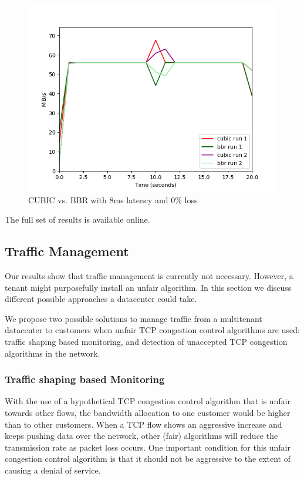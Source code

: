 \documentclass{article}
\begin{document}
\begin{figure}[H]
	\centering
		\includegraphics[scale=0.4]{figs/cubic_vs_bbr_8_0.png}
		\caption{CUBIC vs. BBR with 8ms latency and 0\% loss}
	\label{fig:bbr-cubic-0}
\end{figure}

The full set of results is available online\cite{git-lsproj}.


\subsection{Traffic Management}

Our results show that traffic management is currently not necessary. However, a
tenant might purposefully install an unfair algorithm. In this section we
discuss different possible approaches a datacenter could take.

We propose two possible solutions to manage traffic from a multitenant
datacenter to customers when unfair TCP congestion control algorithms are used:
traffic shaping based monitoring, and detection of unaccepted TCP congestion
algorithms in the network. 

\subsubsection{Traffic shaping based Monitoring}

With the use of a hypothetical TCP congestion control algorithm that is unfair towards other flows, the bandwidth allocation to one customer would be higher than to other customers. When a TCP flow shows an aggressive increase and keeps pushing data over the network, other (fair) algorithms will reduce the transmission rate as packet loss occurs. One important condition for this unfair congestion control algorithm is that it should not be aggressive to the extent of causing a denial of service.
\end{document}
